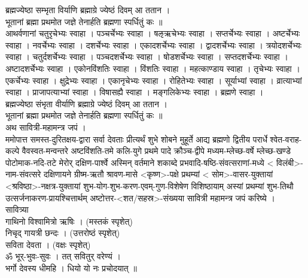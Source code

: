 \documentclass[12pt]{article}
\begin{document}
{{{ब्रह्मज्येष्ठा सम्भृता विर्याणि ब्रह्माग्रे ज्येष्ठं दिवम् आ ततान ।\\
भूतानां ब्रह्मा प्रथमोत जज्ञे तेनार्हति ब्रह्मणा स्पर्धितुं कः ॥\\

आथर्वणानां चतुरृचेभ्यः स्वाहा । पञ्चर्चेभ्यः स्वाहा । षऌऋचेभ्यः स्वाहा । सप्तर्चेभ्यः स्वाहा । अष्टर्चेभ्यः स्वाहा । नवर्चेभ्यः स्वाहा । दशर्चेभ्यः स्वाहा । एकादशर्चेभ्यः स्वाहा । द्वादशर्चेभ्यः स्वाहा । त्रयोदशर्चेभ्यः स्वाहा । चतुर्दशर्चेभ्यः स्वाहा । पञ्चदशर्चेभ्यः स्वाहा । षोडशर्चेभ्यः स्वाहा । सप्तदशर्चेभ्यः स्वाहा । अष्टादशर्चेभ्यः स्वाहा । एकोनविंशतिः स्वाहा । विंशतिः स्वाहा । महत्काण्डाय स्वाहा । तृचेभ्यः स्वाहा । एकर्चेभ्यः स्वाहा । क्षुद्रेभ्यः स्वाहा । एकानृचेभ्यः स्वाहा । रोहितेभ्यः स्वाहा । सूर्याभ्यां स्वाहा । व्रात्याभ्यां स्वाहा । प्राजापत्याभ्यां स्वाहा । विषासह्यै स्वाहा । मङ्गलिकेभ्यः स्वाहा । ब्रह्मणे स्वाहा ।\\

ब्रह्मज्येष्ठा संभृता वीर्याणि ब्रह्माग्रे ज्येष्ठं दिवम् आ ततान ।\\
भूतानां ब्रह्मा प्रथमोत जज्ञे तेनार्हति ब्रह्मणा स्पर्धितुं कः ॥\\

 अथ सावित्री-महामन्त्र जपं ।\\

ममोपात्त समस्त-दुरितक्षय-द्वारा सर्वा देवताः प्रीत्यर्थं शुभे शोबने मुहूर्ते आद्य ब्रह्मणो द्वितीय परार्धे श्वेत-वराह-कल्पे वैवस्वत-मन्वन्तरे अष्टविंशति-तमे कलि-युगे प्रथमे पादे क्रौञ्च-द्वीपे मध्यम-म्लेच्छ-वर्षे म्लेच्छ-खण्डे पोटोमाक-नदि-तटे मेरोर् दक्षिण-पार्श्वे अस्मिन् वर्तमाने शकाब्दे प्रभवादि-षष्ठि-संवत्सराणां-मध्ये < विलंबी>-नाम-संवत्सरे दक्षिणायने ग्रीष्म-ऋतौ श्रावण-मासे <कृष्ण>-पक्षे प्रथम्यां < सोम>-वासर-युक्तायां <श्रविष्ठा>-नक्षत्र-युक्तायां शुभ-योग-शुभ-करण-एवम्-गुण-विशेषेण विशिष्ठायाम् अस्यां प्रथम्यां शुभ-तिथौ उत्सर्जनाकरण-प्रायश्चित्तार्थम् अष्टोत्तर-<शत/सहस्र>-संख्यया सावित्री महामन्त्र जपं करिष्ये ।\\

सावित्र्या\\
गाथिनो विश्वामित्रो ऋषिः । (मस्तकं स्पृशेत्)\\
निचृद् गायत्री छन्दः । (उत्तरोष्ठं स्पृशेत्)\\
सविता देवता । (वक्षः स्पृशेत्)\\

ॐ भूर्-भुवः-सुवः । तत् सवितुर् वरेण्यं ।\\
भर्गो देवस्य धीमहि । धियो यो नः प्रचोदयात् ॥\\
}}}
\end{document}
